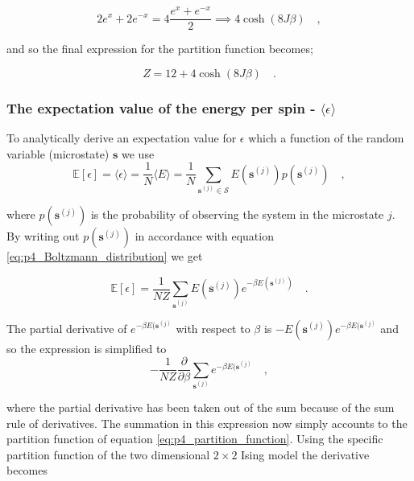 \documentclass[../main_proj4_correct_template.tex]{subfiles}
\begin{document}
$$2e^{x} + 2e^{-x} = 4\frac{e^x+e^{-x}}{2} \implies 4 \cosh(8J\beta) \quad, $$

\noindent and so the final expression for the partition function becomes;

\begin{equation*}
    Z = 12 + 4\cosh(8J\beta) \quad.
\end{equation*}

\subsubsection{The expectation value of the energy per spin - $\langle\epsilon \rangle$}\label{app:p4a_expectation_energyperspin}

To analytically derive an expectation value for $\epsilon$ which a function of the random variable (microstate) $\mathbf{s}$ we use
\begin{equation*}
    \mathbb{E}[\epsilon] 
    = \langle \epsilon \rangle 
    = \frac{1}{N}\langle E\rangle 
    = \frac{1}{N} \sum\limits_{\mathbf{s}^{(j)} \in \mathcal{S}} E(\mathbf{s}^{(j)}) p(\mathbf{s}^{(j)}) \quad ,
\end{equation*}

\noindent where $p(\mathbf{s}^{(j)})$ is the probability of observing the system in the microstate $j$. By writing out $p(\mathbf{s}^{(j)})$ in accordance with equation \eqref{eq:p4_Boltzmann_distribution} we get

\begin{equation*}
    \mathbb{E}[\epsilon] 
    = \frac{1}{NZ}\sum\limits_{\mathbf{s}^{(j)}} E(\mathbf{s}^{(j)}) e^{-\beta E(\mathbf{s}^{(j)})} \quad. 
\end{equation*}

\noindent The partial derivative of $e^{-\beta E(\mathbf{s}^{(j)}}$ with respect to $\beta$ is $-E(\mathbf{s}^{(j)}) e^{-\beta E(\mathbf{s}^{(j)}}$ and so the expression is simplified to 
\begin{equation*}
    -\frac{1}{NZ} \frac{\partial}{\partial\beta} \sum\limits_{\mathbf{s}^{(j)}} e^{-\beta E(\mathbf{s}^{(j)}} \quad, 
\end{equation*}

\noindent where the partial derivative has been taken out of the sum because of the sum rule of derivatives. The summation in this expression now simply accounts to the partition function of equation \eqref{eq:p4_partition_function}. Using the specific partition function of the two dimensional $2\times 2$ Ising model the derivative becomes 
\end{document}
